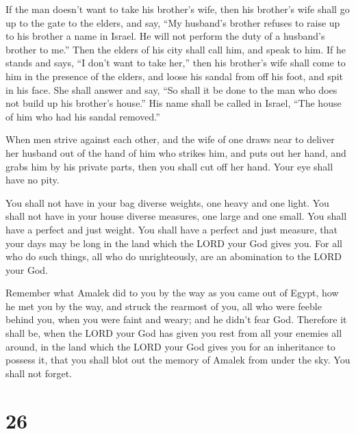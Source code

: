  If the man doesn't want to take his brother's wife, then
his brother's wife shall go up to the gate to the elders, and say, ``My
husband's brother refuses to raise up to his brother a name in Israel.
He will not perform the duty of a husband's brother to me.''
 Then the elders of his city shall call him, and speak to
him. If he stands and says, ``I don't want to take her,'' 
then his brother's wife shall come to him in the presence of the elders,
and loose his sandal from off his foot, and spit in his face. She shall
answer and say, ``So shall it be done to the man who does not build up
his brother's house.''  His name shall be called in Israel,
``The house of him who had his sandal removed.''

 When men strive against each other, and the wife of one
draws near to deliver her husband out of the hand of him who strikes
him, and puts out her hand, and grabs him by his private parts,
 then you shall cut off her hand. Your eye shall have no
pity.

 You shall not have in your bag diverse weights, one heavy
and one light.  You shall not have in your house diverse
measures, one large and one small.  You shall have a
perfect and just weight. You shall have a perfect and just measure, that
your days may be long in the land which the LORD your God gives you.
 For all who do such things, all who do unrighteously, are
an abomination to the LORD your God.

 Remember what Amalek did to you by the way as you came out
of Egypt,  how he met you by the way, and struck the
rearmost of you, all who were feeble behind you, when you were faint and
weary; and he didn't fear God.  Therefore it shall be, when
the LORD your God has given you rest from all your enemies all around,
in the land which the LORD your God gives you for an inheritance to
possess it, that you shall blot out the memory of Amalek from under the
sky. You shall not forget.

\hypertarget{section-25}{%
\section{26}\label{section-25}}

